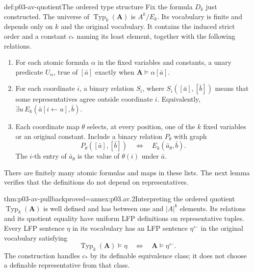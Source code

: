 \begin{hbdefinition}{def:p03-av-quotient}{The ordered type structure}
Fix the formula \(D_k\) just constructed. The universe of
\(\operatorname{Typ}_k(\mathbf A)\) is \(A^k/E_k\). Its vocabulary
is finite and depends only on \(k\) and the original vocabulary.
It contains the induced strict order and a constant \(c_\ast\)
naming its least element, together with the following relations.
\begin{enumerate}
\item For each atomic formula \(\alpha\) in the fixed variables
      and constants, a unary predicate \(U_\alpha\), true of
      \([\bar a]\) exactly when \(\mathbf A\models\alpha[\bar a]\).
\item For each coordinate \(i\), a binary relation \(S_i\), where
      \(S_i([\bar a],[\bar b])\) means that some representatives
      agree outside coordinate \(i\). Equivalently,
      \(\exists u\,E_k(\bar a[i\leftarrow u],\bar b)\).
\item Each coordinate map \(\theta\) selects, at every position,
      one of the \(k\) fixed variables or an original constant.
      Include a binary relation \(P_\theta\) with graph
      \[
       P_\theta([\bar a],[\bar b])
             \quad\Longleftrightarrow\quad E_k(\bar a_\theta,\bar b).
      \]
      The \(i\)-th entry of \(\bar a_\theta\) is the value of
      \(\theta(i)\) under \(\bar a\).
\end{enumerate}
There are finitely many atomic formulas and maps in these lists.
The next lemma verifies that the definitions do not depend on
representatives.
\end{hbdefinition}

\begin{hblemma}{thm:p03-av-pullback}{proved=annex:p03.av.2}{Interpreting the ordered quotient}
\(\operatorname{Typ}_k(\mathbf A)\) is well defined and has between
one and \(|A|^k\) elements. Its relations and its quotient equality
have uniform LFP definitions on representative tuples. Every LFP
sentence \(\eta\) in its vocabulary has an LFP sentence
\(\eta^{\leftarrow}\) in the original vocabulary satisfying
\[
 \operatorname{Typ}_k(\mathbf A)\models\eta
 \quad\Longleftrightarrow\quad
 \mathbf A\models\eta^{\leftarrow}.
\]
The construction handles \(c_\ast\) by its definable equivalence
class; it does not choose a definable representative from that class.
\end{hblemma}

